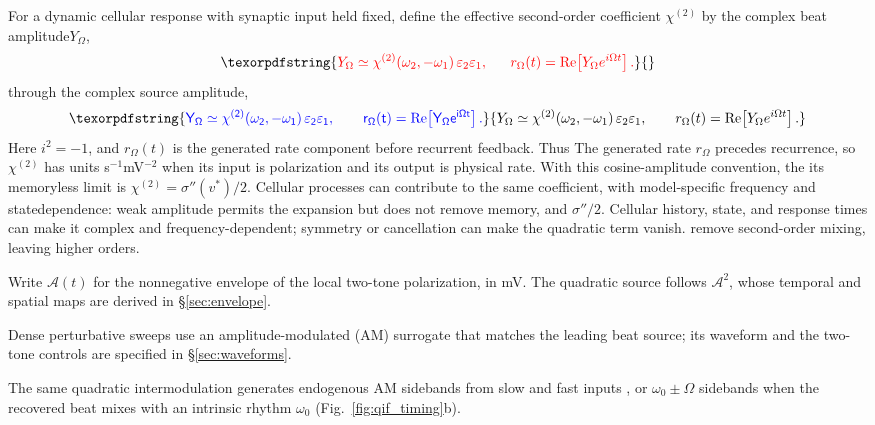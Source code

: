 \documentclass[11pt,a4paper]{article}
\newcommand{\Sig}{\sigma}
\providecommand{\DIFaddtex}[1]{{\protect\color{blue} \sf #1}} %
\providecommand{\DIFdeltex}[1]{{\protect\color{red} \scriptsize #1}} %
\providecommand{\DIFaddbegin}{} %
\providecommand{\DIFaddend}{} %
\providecommand{\DIFdelbegin}{} %
\providecommand{\DIFdelend}{} %
\providecommand{\DIFadd}[1]{\texorpdfstring{\DIFaddtex{#1}}{#1}} %
\providecommand{\DIFdel}[1]{\texorpdfstring{\DIFdeltex{#1}}{}} %
\begin{document}
For a dynamic cellular response with synaptic input held fixed, define
the \DIFdelbegin \DIFdel{effective }\DIFdelend second-order coefficient $\chi^{(2)}$ \DIFdelbegin \DIFdel{by the complex beat amplitude$Y_\Omega$,
}\[
\DIFdel{Y_\Omega\simeq\chi^{(2)}(\omega_2,-\omega_1)\,
\varepsilon_2\varepsilon_1,\qquad
r_\Omega(t)=\operatorname{Re}\!\left[Y_\Omega e^{i\Omega t}\right].
}\]%
\DIFdelend \DIFaddbegin \DIFadd{through the complex source amplitude,
}\begin{equation}
\DIFadd{Y_\Omega\simeq\chi^{(2)}(\omega_2,-\omega_1)\,
\varepsilon_2\varepsilon_1,\qquad
r_\Omega(t)=\operatorname{Re}\!\left[Y_\Omega e^{i\Omega t}\right].
\label{eq:chi2}
}\end{equation}\DIFaddend
\DIFdelbegin \DIFdel{Here $i^2=-1$, and $r_\Omega(t)$ is the generated rate component before recurrent feedback.
Thus }\DIFdelend \DIFaddbegin \DIFadd{The generated rate $r_\Omega$ precedes recurrence, so }\DIFaddend $\chi^{(2)}$ has units
s$^{-1}$mV$^{-2}$\DIFdelbegin \DIFdel{when its input is polarization
and its output is physical rate}\DIFdelend . With this cosine-amplitude convention, \DIFdelbegin \DIFdel{the }\DIFdelend \DIFaddbegin \DIFadd{its }\DIFaddend memoryless
limit is \DIFdelbegin \DIFdel{$\chi^{(2)}=\Sig''(v^*)/2$. Cellular processes can contribute to the same coefficient, with model-specific
frequency and statedependence: weak amplitude permits the expansion but does not
remove memory, and }\DIFdelend \DIFaddbegin \DIFadd{$\Sig''/2$. Cellular history, state, and response times can make
it complex and frequency-dependent; }\DIFaddend symmetry or cancellation can \DIFdelbegin \DIFdel{make the quadratic term vanish.
}\DIFdelend \DIFaddbegin \DIFadd{remove
second-order mixing, leaving higher orders.
}\DIFaddend

\DIFdelbegin \DIFdel{Write $\mathcal A(t)$ for the nonnegative envelope of the local two-tone
polarization, in mV.
The quadratic source follows $\mathcal A^2$, whose temporal
and spatial maps are derived in \S\ref{sec:envelope}.
}%

\DIFdel{Dense perturbative sweeps use an amplitude-modulated (AM) surrogate that matches
the leading beat source; its waveform and the two-tone controls are specified in
\S\ref{sec:waveforms}.
}%

\DIFdel{The same quadratic intermodulation generates endogenous AM sidebands from slow
and fast inputs \cite{ruffini2025ham}, or $\omega_0\pm\Omega$ sidebands when the
recovered beat mixes with an intrinsic rhythm $\omega_0$
(Fig.~\ref{fig:qif_timing}b).
}%
\end{document}
